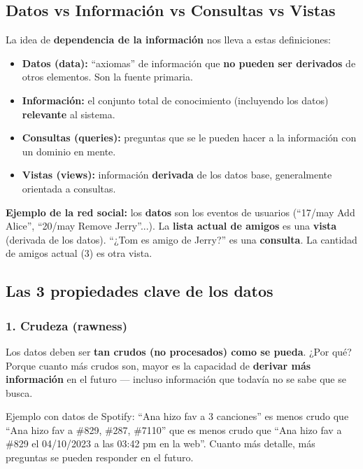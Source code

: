 \documentclass[11pt, a4paper]{article}
\begin{document}
\subsection{Datos vs Información vs Consultas vs Vistas}

La idea de \textbf{dependencia de la información} nos lleva a estas definiciones:

\begin{itemize}
	\item \textbf{Datos (data):} ``axiomas'' de información que \textbf{no pueden ser derivados} de otros elementos. Son la fuente primaria.
	\item \textbf{Información:} el conjunto total de conocimiento (incluyendo los datos) \textbf{relevante} al sistema.
	\item \textbf{Consultas (queries):} preguntas que se le pueden hacer a la información con un dominio en mente.
	\item \textbf{Vistas (views):} información \textbf{derivada} de los datos base, generalmente orientada a consultas.
\end{itemize}

\begin{recallbox}
	\textbf{Ejemplo de la red social:} los \textbf{datos} son los eventos de usuarios (``17/may Add Alice'', ``20/may Remove Jerry''...). La \textbf{lista actual de amigos} es una \textbf{vista} (derivada de los datos). ``¿Tom es amigo de Jerry?'' es una \textbf{consulta}. La cantidad de amigos actual (3) es otra vista.
\end{recallbox}

\subsection{Las 3 propiedades clave de los datos}

\subsubsection{1. Crudeza (rawness)}
Los datos deben ser \textbf{tan crudos (no procesados) como se pueda}. ¿Por qué? Porque cuanto más crudos son, mayor es la capacidad de \textbf{derivar más información} en el futuro --- incluso información que todavía no se sabe que se busca.

Ejemplo con datos de Spotify: ``Ana hizo fav a 3 canciones'' es menos crudo que ``Ana hizo fav a \#829, \#287, \#7110'' que es menos crudo que ``Ana hizo fav a \#829 el 04/10/2023 a las 03:42 pm en la web''. Cuanto más detalle, más preguntas se pueden responder en el futuro.
\end{document}
